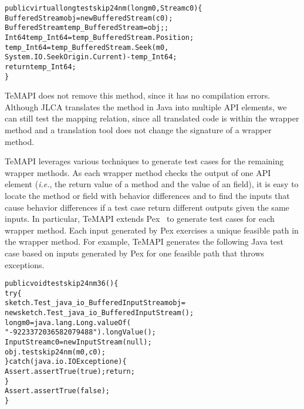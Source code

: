 \begin{CodeOut}\vspace*{-1ex}
\begin{alltt}
public virtual long testskip24nm(long m0, Stream c0)\{
  BufferedStream obj = new BufferedStream(c0);
  BufferedStream temp_BufferedStream = obj;;
  Int64 temp_Int64 = temp_BufferedStream.Position;
  temp_Int64 = temp_BufferedStream.Seek(m0,
  System.IO.SeekOrigin.Current) - temp_Int64;
  return temp_Int64;
\}
\end{alltt}
\end{CodeOut}\vspace*{-2ex}

TeMAPI does not remove this method, since it has no compilation errors. Although JLCA translates the  method in Java into multiple API elements, we can still test the mapping relation, since all translated code is within the wrapper method and a translation tool does not change the signature of a wrapper method.

TeMAPI leverages various techniques to generate test cases for the remaining wrapper methods. As each wrapper method checks the output of one API element (\emph{i.e.}, the return value of a method and the value of an field), it is easy to locate the method or field with behavior differences and to find the inputs that cause behavior differences if a test case return different outputs given the same inputs. In particular, TeMAPI extends Pex~\cite{tillmann2008pex} to generate test cases for each wrapper method. Each input generated by Pex exercises a unique feasible path in the wrapper method. For example, TeMAPI generates the following Java test case based on inputs generated by Pex for one feasible path that throws exceptions.

\begin{CodeOut}\vspace*{-1ex}
\begin{alltt}
public void testskip24nm36()\{
  try\{
     sketch.Test_java_io_BufferedInputStream obj =
        new sketch.Test_java_io_BufferedInputStream();
     long m0 = java.lang.Long.valueOf(
                  "-9223372036582079488").longValue();
     InputStream c0 = new InputStream(null);
     obj.testskip24nm(m0,c0);
  \}catch(java.io.IOException e)\{
     Assert.assertTrue(true);return;
  \}
  Assert.assertTrue(false);
\}
\end{alltt}
\end{CodeOut}\vspace*{-2ex}


